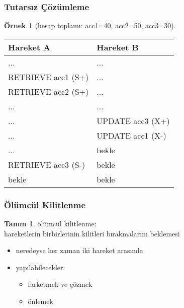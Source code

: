 \documentclass[dvipsnames]{beamer}
\theoremstyle{definition}
\newtheorem{tanim}[theorem]{Tanım}
\theoremstyle{example}
\newtheorem{ornek}[theorem]{Örnek}
\theoremstyle{plain}
\begin{document}
\begin{frame}[fragile]
  \frametitle{Tutarsız Çözümleme}

  \begin{ornek}[hesap toplamı: acc1=40, acc2=50, acc3=30]
    \begin{table}
      \begin{tabular}{ll}
Hareket A            & Hareket B       \\\hline
...                  & ...             \\\pause
RETRIEVE acc1 (S+)   & ...             \\\pause
RETRIEVE acc2 (S+)   & ...             \\\pause
...                  & ...             \\
...                  & UPDATE acc3 (X+)\\\pause
...                  & UPDATE acc1 (X-)\\
...                  & bekle           \\\pause
RETRIEVE acc3 (S-)   & bekle           \\
bekle                & bekle
      \end{tabular}
    \end{table}
  \end{ornek}
\end{frame}

\begin{frame}
  \frametitle{Ölümcül Kilitlenme}

  \begin{tanim}
    \alert{ölümcül kilitlenme}:\\
      hareketlerin birbirlerinin kilitleri bırakmalarını beklemesi
  \end{tanim}

  \pause
  \begin{itemize}
    \item neredeyse her zaman iki hareket arasında
    \item yapılabilecekler:
    \begin{itemize}
      \item farketmek ve çözmek
      \item önlemek
    \end{itemize}
  \end{itemize}
\end{frame}
\end{document}
